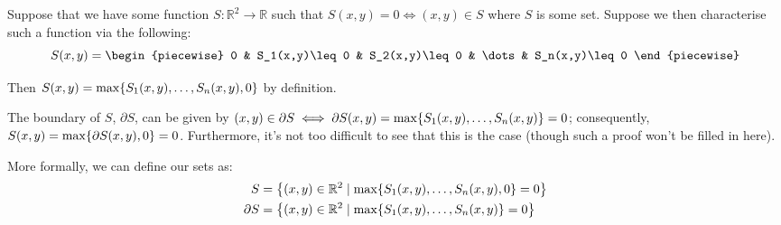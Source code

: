 Suppose that we have some function $S:\mathbb{R}^2\to\mathbb{R}$ such that $S(x,y)=0\iff (x,y)\in S$ where $S$ is some set. Suppose we then characterise such a function via the following:
$$
    S(x,y)=\begin{piecewise}
        0 & S_1(x,y)\leq 0 & S_2(x,y)\leq 0 & \dots & S_n(x,y)\leq 0
    \end{piecewise}
$$

Then $S(x,y)=\max\br{S_1(x,y),\dots,S_n(x,y),0}$ by definition.

The boundary of $S$, $\partial S$, can be given by $(x,y)\in\partial S\iff \partial S(x,y)=\max\br{S_1(x,y),\dots,S_n(x,y)}=0$; consequently, $S(x,y)=\max\br{\partial S(x,y),0}=0$. Furthermore, it's not too difficult to see that this is the case (though such a proof won't be filled in here).

More formally, we can define our sets as:
\begin{align*}
    S &= \br*{(x,y)\in\mathbb{R}^2\mid \max\br{S_1(x,y),\dots,S_n(x,y),0}=0} \\
    \partial S &= \br*{(x,y)\in\mathbb{R}^2\mid \max\br{S_1(x,y),\dots,S_n(x,y)}=0} \\
\end{align*}

\newpage